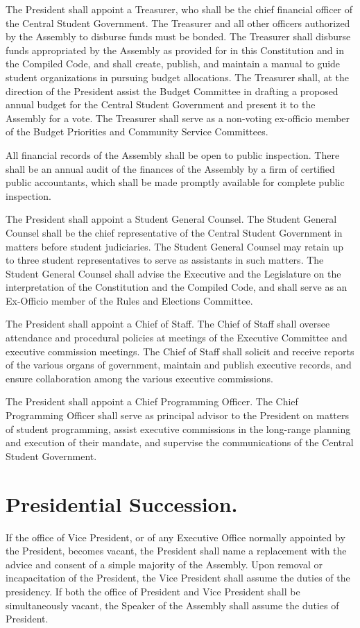    The President shall appoint a Treasurer, who shall be the chief financial officer of the Central Student Government. The Treasurer and all other officers authorized by the Assembly to disburse funds must be bonded. The Treasurer shall disburse funds appropriated by the Assembly as provided for in this Constitution and in the Compiled Code, and shall create, publish, and maintain a manual to guide student organizations in pursuing budget allocations. The Treasurer shall, at the direction of the President assist the Budget Committee in drafting a proposed annual budget for the Central Student Government and present it to the Assembly for a vote. The Treasurer shall serve as a non-voting ex-officio member of the Budget Priorities and Community Service Committees.

    All financial records of the Assembly shall be open to public inspection. There shall be an annual audit of the finances of the Assembly by a firm of certified public accountants, which shall be made promptly available for complete public inspection. 

    The President shall appoint a Student General Counsel. The Student General Counsel shall be the chief representative of the Central Student Government in matters before student judiciaries. The Student General Counsel may retain up to three student representatives to serve as assistants in such matters. The Student General Counsel shall advise the Executive and the Legislature on the interpretation of the Constitution and the Compiled Code, and shall serve as an Ex-Officio member of the Rules and Elections Committee.
    
    The President shall appoint a Chief of Staff. The Chief of Staff shall oversee attendance and procedural policies at meetings of the Executive Committee and executive commission meetings. The Chief of Staff shall solicit and receive reports of the various organs of government, maintain and publish executive records, and ensure collaboration among the various executive commissions. 

    The President shall appoint a Chief Programming Officer. The Chief Programming Officer shall serve as principal advisor to the President on matters of student programming, assist executive commissions in the long-range planning and execution of their mandate, and supervise the communications of the Central Student Government. 

\section{Presidential Succession.}
    If the office of Vice President, or of any Executive Office normally appointed by the President, becomes vacant, the President shall name a replacement with the advice and consent of a simple majority of the Assembly. Upon removal or incapacitation of the President, the Vice President shall assume the duties of the presidency. If both the office of President and Vice President shall be simultaneously vacant, the Speaker of the Assembly shall assume the duties of President.
